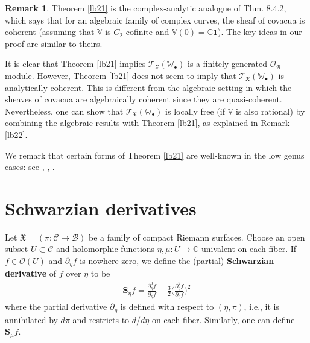 \documentclass[12pt,a4paper,notitlepage]{article}
\theoremstyle{definition}
\newtheorem{rem}[df]{Remark}
\theoremstyle{plain}
\newcommand{\fk}{\mathfrak}
\newcommand{\mc}{\mathcal}
\newcommand{\id}{\mathbf{1}}
\newcommand{\scr}{\mathscr}
\newcommand{\blt}{\bullet}
\newcommand{\Vbb}{\mathbb V}
\newcommand{\Wbb}{\mathbb W}
\newcommand{\Cbb}{\mathbb C}
\newcommand{\Sbf}{\mathbf{S}}
\numberwithin{equation}{section}
\begin{document}
\begin{rem}\label{lb54}
Theorem \ref{lb21} is the complex-analytic analogue of \cite{DGT19b} Thm. 8.4.2, which says that for an algebraic family of complex curves, the sheaf of covacua is coherent (assuming that $\Vbb$ is $C_2$-cofinite and $\Vbb(0)=\Cbb\id$). The key ideas in our proof are similar to theirs.

It is clear that Theorem \ref{lb21} implies $\scr T_{\fk X}(\Wbb_\blt)$ is a finitely-generated $\scr O_{\mc B}$-module. However,  Theorem \ref{lb21} does not seem to imply that $\scr T_{\fk X}(\Wbb_\blt)$ is analytically coherent. This is different from the algebraic setting in  which the sheaves of covacua are algebraically coherent since they are quasi-coherent. Nevertheless, one can show that $\scr T_{\fk X}(\Wbb_\blt)$ is locally free (if $\Vbb$ is also rational)  by combining  the algebraic results with Theorem \ref{lb21}, as explained in Remark \ref{lb22}. 




We remark that certain forms of Theorem \ref{lb21} are well-known in the  low genus cases: see \cite[Lemma 4.4.1]{Zhu96}, \cite[Cor. 1.2]{Hua05a}, \cite[Cor. 3.4]{Hua05b}. 
\end{rem}







\section{Schwarzian derivatives}

Let $\fk X=(\pi:\mc C\rightarrow\mc B)$ be a family of compact Riemann surfaces.  Choose an open subset $U\subset \mc C$ and holomorphic functions $\eta,\mu:U\rightarrow\Cbb$ univalent on each fiber. If $f\in\scr O(U)$ and $\partial_\eta f$ is nowhere zero, we define the (partial) \textbf{Schwarzian derivative} of $f$ over $\eta$ to be \index{S@$\Sbf_\eta f,\Sbf_\eta\fk P$}
\begin{align}
\Sbf_\eta f=\frac{\partial_\eta^3f}{\partial_\eta f}-\frac 32 \Big(\frac{\partial_\eta^2f}{\partial_\eta f} \Big)^2
\end{align}
where the partial derivative $\partial_\eta$ is defined with respect to $(\eta,\pi)$, i.e., it is annihilated by $d\pi$ and restricts to $d/d\eta$ on each fiber. Similarly, one can define $\Sbf_\mu f$. 
\end{document}
